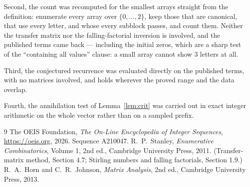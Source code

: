 \documentclass[11pt,a4paper]{article}
\theoremstyle{plain}
\theoremstyle{definition}
\begin{document}
Second, the count was recomputed for the smallest arrays straight from the definition:
enumerate every array over $\{0,\dots,2\}$, keep those that are canonical, that use every
letter, and whose every subblock passes, and count them. Neither the transfer matrix nor the
falling-factorial inversion is involved, and the published terms came back --- including the
initial zeros, which are a sharp test of the ``containing all values'' clause: a small array
cannot show $3$ letters at all.

Third, the conjectured recurrence was evaluated directly on the published terms, with no
matrices involved, and holds wherever the proved range and the data overlap.

Fourth, the annihilation test of Lemma~\ref{lem:crit} was carried out in exact integer
arithmetic on the whole vector rather than on a sampled prefix.

\begin{thebibliography}{9}
 The OEIS Foundation, \emph{The On-Line Encyclopedia of Integer
Sequences}, \url{https://oeis.org}, 2026. Sequence A210047.
 R.~P.~Stanley, \emph{Enumerative Combinatorics}, Volume 1, 2nd ed.,
Cambridge University Press, 2011. (Transfer-matrix method, Section 4.7; Stirling numbers and
falling factorials, Section 1.9.)
 R.~A.~Horn and C.~R.~Johnson, \emph{Matrix Analysis}, 2nd ed., Cambridge
University Press, 2013.
\end{thebibliography}
\end{document}
